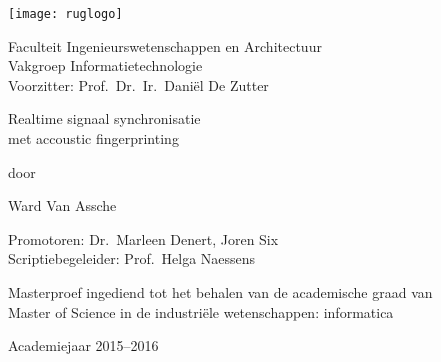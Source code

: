 

\begin{titlepage}

\setlength{\hoffset}{-1in}
\setlength{\voffset}{-1in}
\setlength{\topmargin}{1.5cm}
\setlength{\headheight}{0.5cm}
\setlength{\headsep}{1cm}
\setlength{\oddsidemargin}{3cm}
\setlength{\evensidemargin}{3cm}
\setlength{\footskip}{1.5cm}
\enlargethispage{1cm}

\fontsize{12pt}{14pt}
\selectfont

\begin{center}

\texttt{[image: ruglogo]}

\vspace{0.5cm}

Faculteit Ingenieurswetenschappen en Architectuur\\
Vakgroep Informatietechnologie\\
Voorzitter: Prof.~Dr.~Ir.~Daniël De Zutter

\vspace{3cm}

\fontsize{17.28pt}{21pt}
\selectfont

Realtime signaal synchronisatie \\
met accoustic fingerprinting

\fontsize{12pt}{14pt}
\selectfont

\vspace{.6cm}

door 

\vspace{.4cm}

Ward Van Assche

\vspace{2.5cm}

Promotoren: Dr.~Marleen Denert, Joren Six\\
Scriptiebegeleider: Prof.~Helga Naessens\\

\vspace{2cm}

Masterproef ingediend tot het behalen van de academische graad van\\
Master of Science in de industriële wetenschappen: informatica

\vspace{0.5cm}

Academiejaar 2015--2016

\end{center}
\end{titlepage}
